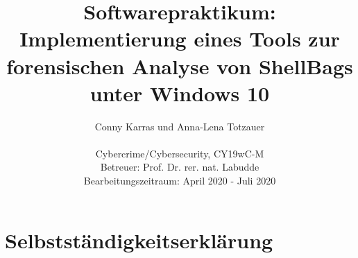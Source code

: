 \documentclass{scrartcl}%
\begin{document}
	\title{Softwarepraktikum: \\ 
		Implementierung eines Tools zur forensischen Analyse von ShellBags unter Windows 10}
	\author{Conny Karras und Anna-Lena Totzauer
		\\
		\\ \small{Cybercrime/Cybersecurity, CY19wC-M}
		\\ \small{Betreuer: Prof. Dr. rer. nat. Labudde}
		\\ \small{Bearbeitungszeitraum: April 2020 - Juli 2020}
		\\ \footnotesize{}}

   	\date{}
	\maketitle
 	\thispagestyle{empty}

	 \newpage 
	 \tableofcontents
	 \thispagestyle{empty}
	
	 \newpage
	 \listoffigures
	 
	 \listoftables
	 \newpage
	 

	
	
	
	
	
	
	

	
	
	
	
	
	
	
	
	

	
	\newpage
	
	
	
	\newpage
	\thispagestyle{empty}
	\section*{Selbstständigkeitserklärung}
	\vspace{15mm}
	
\end{document}
